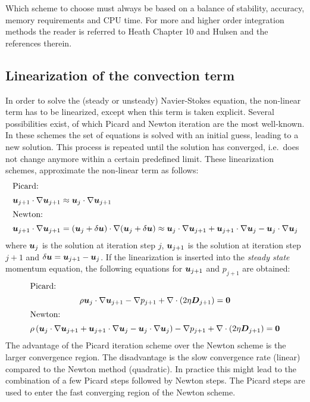 Which scheme to choose must always be based on a balance of stability, accuracy, memory requirements and CPU time.
For more and higher order integration methods the reader is referred to Heath Chapter 10 \cite{Heath02} and Hulsen \cite{Hulsen96} and
the references therein.

\subsection{Linearization of the convection term}
\label{sec:nonlin}
In order to solve the (steady or unsteady) Navier-Stokes equation, the non-linear term has to be linearized, except when this term is taken explicit.
Several possibilities exist, of which Picard and Newton iteration are the most well-known. In these schemes the set of equations is solved with an initial guess, leading to a new solution. This process is repeated until the solution has converged, i.e.\ does not change anymore within a certain predefined limit. These linearization schemes, approximate the non-linear term as follows:\vspace*{-2ex}
\begin{align}
\intertext{Picard:}
\boldsymbol{u}_{j+1} \cdot \nabla \boldsymbol{u}_{j+1} & \approx \boldsymbol{u}_{j} \cdot \nabla \boldsymbol{u}_{j+1} \\
\intertext{Newton:}
\boldsymbol{u}_{j+1} \cdot \nabla \boldsymbol{u}_{j+1} & = (\boldsymbol{u}_j + \delta \boldsymbol{u})\cdot \nabla (\boldsymbol{u}_j + \delta \boldsymbol{u})
 \approx \boldsymbol{u}_{j} \cdot \nabla \boldsymbol{u}_{j+1} + \boldsymbol{u}_{j+1} \cdot \nabla \boldsymbol{u}_{j} - \boldsymbol{u}_{j} \cdot \nabla \boldsymbol{u}_{j}
\end{align}
where $\boldsymbol{u}_{j}$ is the solution at iteration step $j$, $\boldsymbol{u}_{j+1}$ 
is the solution at iteration step $j+1$ and $\delta \boldsymbol{u}= \boldsymbol{u}_{j+1} - \boldsymbol{u}_{j}$.
If the linearization is inserted into the \emph{steady state} momentum equation, the following equations
for $\boldsymbol{u}_{j+1}$ and $p_{j+1}$ are obtained:\vspace*{-2ex}
\begin{gather}
\intertext{Picard:}
\rho \boldsymbol{u}_{j} \cdot \nabla \boldsymbol{u}_{j+1} - \nabla p_{j+1} + \nabla \cdot (2 \eta \boldsymbol{D}_{j+1}) = \boldsymbol{0} \\
\intertext{Newton:}
\rho \left( \boldsymbol{u}_{j} \cdot \nabla \boldsymbol{u}_{j+1} + \boldsymbol{u}_{j+1} \cdot \nabla \boldsymbol{u}_{j} - \boldsymbol{u}_{j} \cdot \nabla \boldsymbol{u}_{j} \right ) -
\nabla p_{j+1} + \nabla \cdot ( 2 \eta \boldsymbol{D}_{j+1})= \boldsymbol{0}
\end{gather}
The advantage of the Picard iteration scheme over the Newton scheme is the larger convergence region. The disadvantage 
is the slow convergence rate (linear) compared to the Newton method (quadratic).
In practice this might lead to the combination of a few Picard steps
followed by Newton steps.
The Picard steps are used to enter the fast converging region of the Newton scheme.

